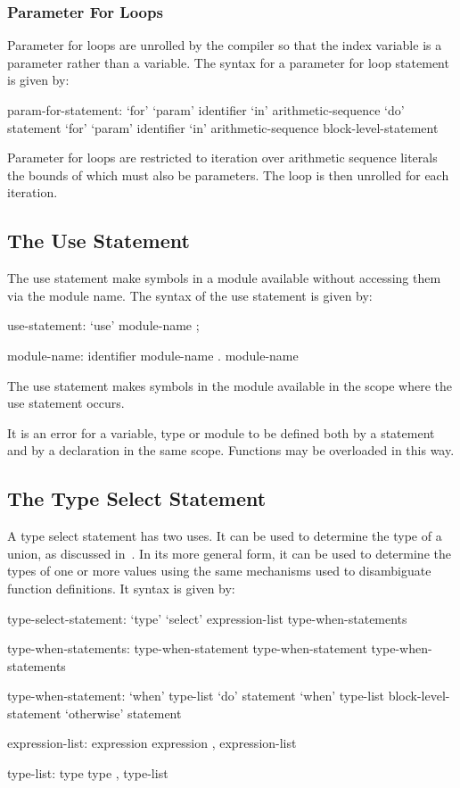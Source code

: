 \subsubsection{Parameter For Loops}
\label{Parameter_For_Loops}

Parameter for loops are unrolled by the compiler so that the index
variable is a parameter rather than a variable.  The syntax for a
parameter for loop statement is given by:
\begin{syntax}
param-for-statement:
  `for' `param' identifier `in' arithmetic-sequence `do' statement
  `for' `param' identifier `in' arithmetic-sequence block-level-statement
\end{syntax}
Parameter for loops are restricted to iteration over arithmetic
sequence literals the bounds of which must also be parameters.  The
loop is then unrolled for each iteration.

\subsection{The Use Statement}
\label{The_Use_Statement}

The use statement make symbols in a module available without accessing
them via the module name.  The syntax of the use statement is given
by:
\begin{syntax}
use-statement:
  `use' module-name ;

module-name:
  identifier
  module-name . module-name
\end{syntax}
The use statement makes symbols in the module available in the scope
where the use statement occurs.

It is an error for a variable, type or module to be defined both by a
 statement and by a declaration in the same scope.
Functions may be overloaded in this way.

\subsection{The Type Select Statement}
\label{The_Type_Select_Statement}

A type select statement has two uses.  It can be used to determine the
type of a union, as discussed
in~.  In its more general
form, it can be used to determine the types of one or more values
using the same mechanisms used to disambiguate function definitions.
It syntax is given by:
\begin{syntax}
type-select-statement:
  `type' `select' expression-list { type-when-statements }

type-when-statements:
  type-when-statement
  type-when-statement type-when-statements

type-when-statement:
  `when' type-list `do' statement
  `when' type-list block-level-statement
  `otherwise' statement

expression-list:
  expression
  expression , expression-list

type-list:
  type
  type , type-list
\end{syntax}

